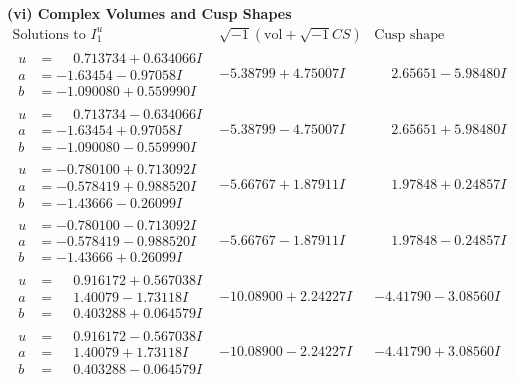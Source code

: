 \documentclass[1p]{elsarticle_modified}
\theoremstyle{definition}
\newcommand{\I}{\sqrt{-1}}
\begin{document}
\newpage\flushleft \textbf{(vi) Complex Volumes and Cusp Shapes}
$$\begin{array}{c|c|c}  
\text{Solutions to }I^u_{1}& \I (\text{vol} + \sqrt{-1}CS) & \text{Cusp shape}\\
 \hline 
\begin{aligned}
u &= \phantom{-}0.713734 + 0.634066 I \\
a &= -1.63454 - 0.97058 I \\
b &= -1.090080 + 0.559990 I\end{aligned}
 & -5.38799 + 4.75007 I & \phantom{-}2.65651 - 5.98480 I \\ \hline\begin{aligned}
u &= \phantom{-}0.713734 - 0.634066 I \\
a &= -1.63454 + 0.97058 I \\
b &= -1.090080 - 0.559990 I\end{aligned}
 & -5.38799 - 4.75007 I & \phantom{-}2.65651 + 5.98480 I \\ \hline\begin{aligned}
u &= -0.780100 + 0.713092 I \\
a &= -0.578419 + 0.988520 I \\
b &= -1.43666 - 0.26099 I\end{aligned}
 & -5.66767 + 1.87911 I & \phantom{-}1.97848 + 0.24857 I \\ \hline\begin{aligned}
u &= -0.780100 - 0.713092 I \\
a &= -0.578419 - 0.988520 I \\
b &= -1.43666 + 0.26099 I\end{aligned}
 & -5.66767 - 1.87911 I & \phantom{-}1.97848 - 0.24857 I \\ \hline\begin{aligned}
u &= \phantom{-}0.916172 + 0.567038 I \\
a &= \phantom{-}1.40079 - 1.73118 I \\
b &= \phantom{-}0.403288 + 0.064579 I\end{aligned}
 & -10.08900 + 2.24227 I & -4.41790 - 3.08560 I \\ \hline\begin{aligned}
u &= \phantom{-}0.916172 - 0.567038 I \\
a &= \phantom{-}1.40079 + 1.73118 I \\
b &= \phantom{-}0.403288 - 0.064579 I\end{aligned}
 & -10.08900 - 2.24227 I & -4.41790 + 3.08560 I \\ \hline\begin{aligned}

\end{aligned}
\end{array}$$
\end{document}
